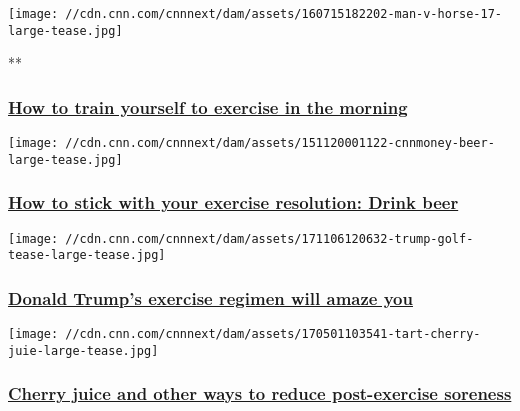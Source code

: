 \texttt{[image: //cdn.cnn.com/cnnnext/dam/assets/160715182202-man-v-horse-17-large-tease.jpg]}

**

\hypertarget{how-to-train-yourself-to-exercise-in-the-morning}{%
\subsubsection{\texorpdfstring{\href{/videos/health/2017/04/03/living-to-100-dr-sanjay-gupta-morning-exercise-workout.cnn}{How
to train yourself to exercise in the
morning}}{How to train yourself to exercise in the morning}}\label{how-to-train-yourself-to-exercise-in-the-morning}}

\href{/2016/01/06/health/beer-as-an-exercise-motivator/index.html}{}

\texttt{[image: //cdn.cnn.com/cnnnext/dam/assets/151120001122-cnnmoney-beer-large-tease.jpg]}

\hypertarget{how-to-stick-with-your-exercise-resolution-drink-beer}{%
\subsubsection{\texorpdfstring{\href{/2016/01/06/health/beer-as-an-exercise-motivator/index.html}{How
to stick with your exercise resolution: Drink
beer}}{How to stick with your exercise resolution: Drink beer}}\label{how-to-stick-with-your-exercise-resolution-drink-beer}}

\href{/2018/01/18/politics/donald-trump-exercise-analysis/index.html}{}

\texttt{[image: //cdn.cnn.com/cnnnext/dam/assets/171106120632-trump-golf-tease-large-tease.jpg]}

\hypertarget{donald-trumps-exercise-regimen-will-amaze-you}{%
\subsubsection{\texorpdfstring{\href{/2018/01/18/politics/donald-trump-exercise-analysis/index.html}{Donald
Trump's exercise regimen will amaze
you}}{Donald Trump's exercise regimen will amaze you}}\label{donald-trumps-exercise-regimen-will-amaze-you}}

\href{/2017/10/11/health/exercise-soreness-fitness-exercise-davis/index.html}{}

\texttt{[image: //cdn.cnn.com/cnnnext/dam/assets/170501103541-tart-cherry-juie-large-tease.jpg]}

\hypertarget{cherry-juice-and-other-ways-to-reduce-post-exercise-soreness}{%
\subsubsection{\texorpdfstring{\href{/2017/10/11/health/exercise-soreness-fitness-exercise-davis/index.html}{Cherry
juice and other ways to reduce post-exercise
soreness}}{Cherry juice and other ways to reduce post-exercise soreness}}\label{cherry-juice-and-other-ways-to-reduce-post-exercise-soreness}}

